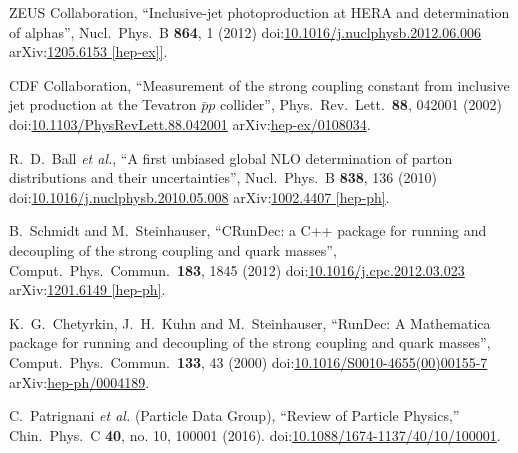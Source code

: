 \begin{thebibliography}{99}
ZEUS Collaboration, ``Inclusive-jet photoproduction at HERA and determination of alphas'', Nucl.\ Phys.\ B {\bf 864}, 1 (2012) doi:\href{http://dx.doi.org/10.1016/j.nuclphysb.2012.06.006}{10.1016/j.nuclphysb.2012.06.006} arXiv:\href{https://arxiv.org/abs/1205.6153}{1205.6153 [hep-ex]]}.

CDF Collaboration, ``Measurement of the strong coupling constant from inclusive jet production at the Tevatron $\bar{p}p$ collider'', Phys.\ Rev.\ Lett.\  {\bf 88}, 042001 (2002) doi:\href{http://dx.doi.org/10.1103/PhysRevLett.88.042001}{10.1103/PhysRevLett.88.042001} arXiv:\href{https://arxiv.org/pdf/hep-ex/0108034.pdf}{hep-ex/0108034}.

R.~D.~Ball {\it et al.}, ``A first unbiased global NLO determination of parton distributions and their uncertainties'', Nucl.\ Phys.\ B {\bf 838}, 136 (2010) doi:\href{http://dx.doi.org/10.1016/j.nuclphysb.2010.05.008}{10.1016/j.nuclphysb.2010.05.008} arXiv:\href{https://arxiv.org/abs/1002.4407}{1002.4407 [hep-ph]}.

B.~Schmidt and M.~Steinhauser, ``CRunDec: a C++ package for running and decoupling of the strong coupling and quark masses'', Comput.\ Phys.\ Commun.\  {\bf 183}, 1845 (2012) doi:\href{http://dx.doi.org/10.1016/j.cpc.2012.03.023}{10.1016/j.cpc.2012.03.023} arXiv:\href{https://arxiv.org/abs/1201.6149}{1201.6149 [hep-ph]}.

K.~G.~Chetyrkin, J.~H.~Kuhn and M.~Steinhauser, ``RunDec: A Mathematica package for running and decoupling of the strong coupling and quark masses'', Comput.\ Phys.\ Commun.\  {\bf 133}, 43 (2000) doi:\href{http://dx.doi.org/10.1016/S0010-4655(00)00155-7}{10.1016/S0010-4655(00)00155-7} arXiv:\href{https://arxiv.org/abs/hep-ph/0004189}{hep-ph/0004189}.

C.~Patrignani {\it et al.} (Particle Data Group), ``Review of Particle Physics,'' Chin.\ Phys.\ C {\bf 40}, no. 10, 100001 (2016). doi:\href{http://dx.doi.org/10.1088/1674-1137/40/10/100001}{10.1088/1674-1137/40/10/100001}.


\end{thebibliography}
